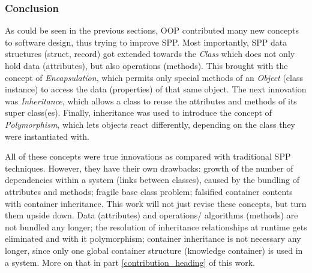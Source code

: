 %
%
%
%
%
%
%

\subsubsection{Conclusion}
\label{conclusion_heading}

As could be seen in the previous sections, OOP contributed many new concepts
to software design, thus trying to improve SPP. Most importantly, SPP data
structures (struct, record) got extended towards the \emph{Class} which does
not only hold data (attributes), but also operations (methods). This brought
with the concept of \emph{Encapsulation}, which permits only special methods of
an \emph{Object} (class instance) to access the data (properties) of that same
object. The next innovation was \emph{Inheritance}, which allows a class to
reuse the attributes and methods of its super class(es). Finally, inheritance
was used to introduce the concept of \emph{Polymorphism}, which lets objects
react differently, depending on the class they were instantiated with.

All of these concepts were true innovations as compared with traditional SPP
techniques. However, they have their own drawbacks: growth of the number of
dependencies within a system (links between classes), caused by the bundling of
attributes and methods; fragile base class problem; falsified container
contents with container inheritance. This work will not just revise these
concepts, but turn them upside down. Data (attributes) and operations/
algorithms (methods) are not bundled any longer; the resolution of inheritance
relationships at runtime gets eliminated and with it polymorphism; container
inheritance is not necessary any longer, since only one global container
structure (knowledge container) is used in a system. More on that in part
\ref{contribution_heading} of this work.
